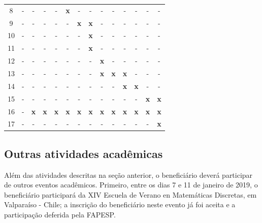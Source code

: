 \documentclass[12pt]{article}
\begin{document}
\begin{table}[ht!]
\begin{center}
{\begin{tabular}{c c ccc ccc ccc ccc}
    8
    & \small - & \small - & \small - & \small -  
    & \small {\bf x} & \small - & \small - & \small -
    & \small - & \small - & \small - & \small - & \small - \\ 
    9
    & \small - & \small - & \small - & \small -  
    & \small - & \small {\bf x} & \small {\bf x} & \small -
    & \small - & \small - & \small - & \small - & \small - \\ 
    10
    & \small - & \small - & \small - & \small -  
    & \small - & \small - & \small {\bf x} & \small -
    & \small - & \small - & \small - & \small - & \small - \\ 
    11
    & \small - & \small - & \small - & \small -  
    & \small - & \small - & \small {\bf x} & \small -
    & \small - & \small - & \small - & \small - & \small - \\ 
    12
    & \small - & \small - & \small - & \small -  
    & \small - & \small - & \small - & \small {\bf x}
    & \small - & \small - & \small - & \small - & \small - \\ 
    13
    & \small - & \small - & \small - & \small -  
    & \small - & \small - & \small - & \small {\bf x}
    & \small {\bf x} & \small {\bf x} & \small - & \small - & \small - \\ 
    14
    & \small - & \small - & \small - & \small -  
    & \small - & \small - & \small - & \small -
    & \small - & \small {\bf x} & \small {\bf x} & \small - & \small - \\ 

    15
    & \small - & \small - & \small - & \small -  
    & \small - & \small - & \small - & \small -
    & \small - & \small - & \small - & \small {\bf x} & \small {\bf x} \\ 
    16
    & \small - & \small {\bf x} & \small {\bf x} & \small {\bf x}  
    & \small {\bf x} & \small {\bf x} & \small {\bf x} & \small {\bf x}
    & \small {\bf x} & \small {\bf x} & \small {\bf x} & \small {\bf x} & \small {\bf x} \\ 
    17
    & \small - & \small - & \small - & \small -  
    & \small - & \small - & \small - & \small -
    & \small - & \small - & \small - & \small - & \small {\bf x} \\ 

    \bottomrule
\end{tabular}
}
\end{center}
\end{table}

\subsection{Outras atividades acadêmicas}
Além das atividades descritas na seção anterior, o beneficiário deverá
participar de outros eventos acadêmicos. Primeiro, entre os dias 
7 e 11 de janeiro de 2019, o beneficiário participará da XIV Escuela de
Verano en Matemáticas Discretas, em Valparaíso - Chile; a inscrição
do beneficiário neste evento já foi aceita e a participação deferida 
pela FAPESP. 
\end{document}

